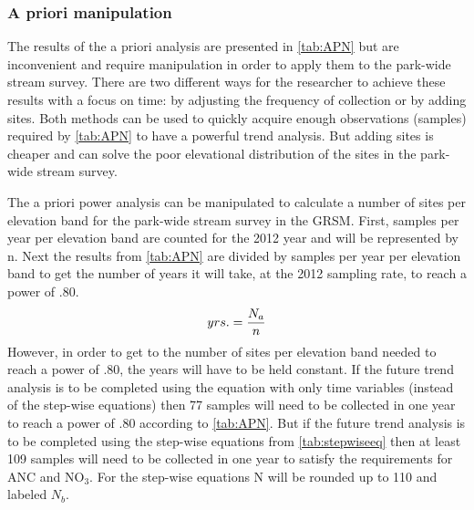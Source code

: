 







\subsubsection{A priori manipulation}



The results of the a priori analysis are presented in \autoref{tab:APN} but are inconvenient and require manipulation in order to apply them to the park-wide stream survey.
There are two different ways for the researcher to achieve these results with a focus on time: by adjusting the frequency of collection or by adding sites.
Both methods can be used to quickly acquire enough observations (samples) required by \autoref{tab:APN} to have a powerful trend analysis.
But adding sites is cheaper and can solve the poor elevational distribution of the sites in the park-wide stream survey.

The a priori power analysis can be manipulated to calculate a number of sites per elevation band for the park-wide stream survey in the GRSM.
First, samples per year per elevation band are counted for the 2012 year and will be represented by n.
Next the results from \autoref{tab:APN} are divided by samples per year per elevation band to get the number of years it will take, at the 2012 sampling rate, to reach a power of .80.
\begin{equation} \label{eq:yrs}
    yrs. = {N_a \over n}
\end{equation}
However, in order to get to the number of sites per elevation band needed to reach a power of .80, the years will have to be held constant.
If the future trend analysis is to be completed using the equation with only time variables (instead of the step-wise equations) then 77 samples will need to be collected in one year to reach a power of .80 according to \autoref{tab:APN}.
But if the future trend analysis is to be completed using the step-wise equations from \autoref{tab:stepwiseeq} then at least 109 samples will need to be collected in one year to satisfy the requirements for ANC and NO$_3$.
For the step-wise equations N will be rounded up to 110 and labeled $N_b$.



